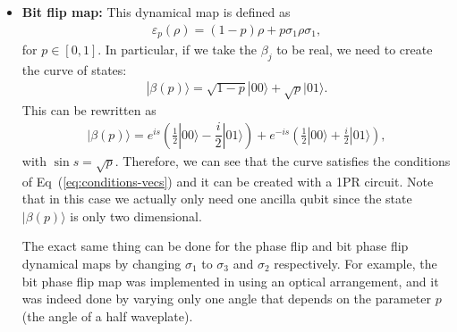\documentclass[10pt,letterpaper]{article} %
\newcommand{\eref}[1]{Eq~(\ref{#1})}
\begin{document}
\begin{itemize}
\item \textbf{Bit flip map:} 
This dynamical map is defined as
\begin{align*}
\varepsilon_p(\rho) = (1-p)\rho + p\sigma_1 \rho \sigma_1,
\end{align*}
for $p \in [0,1]$. 
In particular, if we take the $\beta_j$ to be real,
we need to create the curve of states:
\begin{align*}
|\beta(p)\rangle = \sqrt{1-p} |00\rangle +\sqrt{p} |01\rangle.
\end{align*}
This can be rewritten as
\begin{align*}
|\beta(p) \rangle = e^{is}  \left(\frac{1}{2} |00\rangle - \dfrac{i}{2} |01\rangle \right) + e^{-is} \left( \frac{1}{2} |00\rangle + \frac{i}{2} |01\rangle \right),
\end{align*}
with $\sin s= \sqrt{p}$.
Therefore, we can see that the curve satisfies the conditions of  \eref{eq:conditions-vecs} 
and it can be created with a 1PR circuit.
Note that in this case we actually only need one ancilla qubit
since the state $|\beta(p)\rangle$ is only two dimensional.

The exact same thing can be done
for the phase flip and bit phase flip dynamical maps by
changing $\sigma_1$ to
$\sigma_3$ and $\sigma_2$ respectively.
For example, the bit phase flip map was implemented in \cite{Andrea, Andrea_4qb} 
using an optical arrangement, and  it was indeed done 
by varying only one angle that depends on the parameter $p$ (the angle of a half waveplate).

\end{itemize}
\end{document}
